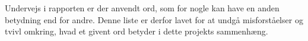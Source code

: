 Undervejs i rapporten er der anvendt ord, som for nogle kan have en anden betydning end for andre. Denne liste er derfor lavet for at undgå misforståelser og tvivl omkring, hvad et givent ord betyder i dette projekts sammenhæng. 